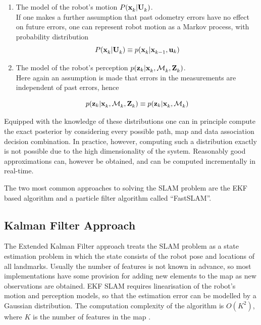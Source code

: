 \begin{enumerate}

\item The model of the robot's motion $P(\x{k}{}{} | \Uall{k}{})$. \\
If one makes a further assumption that past odometry errors have no
effect on future errors, one can represent robot motion as a Markov
process, with probability distribution 
\begin{equation}
 P(\x{k}{}{} | \Uall{k}{}) \equiv p(\x{k}{}{}| \x{k-1}{}{}, \U{k})
\end{equation}


\item The model of the robot's perception
$p(\z{k}| \x{k}{}{},\map{k}{}{}, \Zall{k}{})$.\\
Here again an assumption is made that errors in the measurements are
independent of past errors, hence

\begin{equation}
p(\z{k}| \x{k}{}{},\map{k}{}{}, \Zall{k}{}) \equiv 
  p(\z{k}| \x{k}{}{},\map{k}{}{})
\end{equation}


\end{enumerate}

Equipped with the knowledge of these distributions one can in
principle compute the exact posterior by considering every possible
path, map and data association decision combination. In practice,
however, computing such a distribution exactly is not possible due to
the high dimensionality of the system. Reasonably good approximations
can, however be obtained, and can be computed incrementally in
real-time.

The two most common approaches to solving the SLAM problem are the EKF
based algorithm and a particle filter algorithm called ``FastSLAM''.

\subsection{Kalman Filter Approach}
The Extended Kalman Filter approach treats the SLAM problem as a state
estimation problem in which the state consists of the robot pose and
locations of all landmarks. Usually the number of features is not
known in advance, so most implementations have some provision for
adding new elements to the map as new observations are obtained. EKF
SLAM requires linearisation of the robot's motion and perception
models, so that the estimation error can be modelled by a Gaussian
distribution.  The computation complexity of the algorithm is
$O(K^2)$, where $K$ is the number of features in the map
\cite{ekf_slam}.

